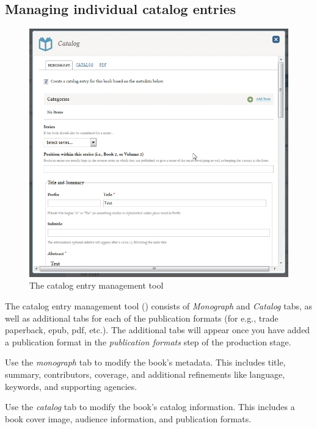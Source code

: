 \subsection*{Managing individual catalog entries}

\begin{figure}[h] \centering
\includegraphics[width=1\textwidth]{./img/metadata.jpg} \caption{The catalog entry management tool}
\label{fig:metadata}
\end{figure}

The catalog entry management tool () consists of \textit{Monograph} and \textit{Catalog} tabs, as well as additional tabs for each of the publication formats (for e.g., trade paperback, epub, pdf, etc.). The additional tabs will appear once you have added a publication format in the \textit{publication formats} step of the production stage. 

Use the \textit{monograph} tab to modify the book's metadata. This includes title, summary, contributors, coverage, and additional refinements like language, keywords, and supporting agencies. 

 Use the \textit{catalog} tab to modify the book's catalog information. This includes a book cover image, audience information, %
and publication formats. 

